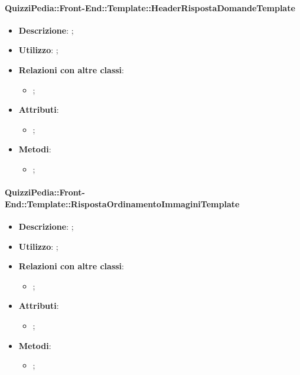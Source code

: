 		\paragraph{QuizziPedia::Front-End::Template::HeaderRispostaDomandeTemplate}
			\begin{itemize}
				\item \textbf{Descrizione}: ;
				\item \textbf{Utilizzo}: ;
				\item \textbf{Relazioni con altre classi}: 
				\begin{itemize}
					\item ;
				\end{itemize}
				\item \textbf{Attributi}: 
				\begin{itemize}
					\item ;
				\end{itemize}
				\item \textbf{Metodi}: 
				\begin{itemize}
					\item ;
				\end{itemize}
			\end{itemize}

		\paragraph{QuizziPedia::Front-End::Template::RispostaOrdinamentoImmaginiTemplate}
			\begin{itemize}
				\item \textbf{Descrizione}: ;
				\item \textbf{Utilizzo}: ;
				\item \textbf{Relazioni con altre classi}: 
				\begin{itemize}
					\item ;
				\end{itemize}
				\item \textbf{Attributi}: 
				\begin{itemize}
					\item ;
				\end{itemize}
				\item \textbf{Metodi}: 
				\begin{itemize}
					\item ;
				\end{itemize}
			\end{itemize}
		
